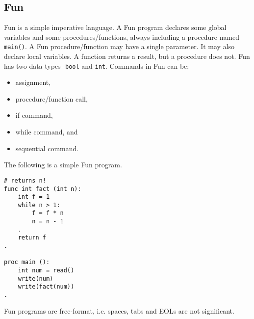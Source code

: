 \documentclass[a4paper, openany]{memoir}
\begin{document}
\subsection{Fun}
Fun is a simple imperative language. A Fun program declares some global variables and some procedures/functions, always including a procedure named \texttt{main()}. A Fun procedure/function may have a single parameter. It may also declare local variables. A function returns a result, but a procedure does not. Fun has two data types- \texttt{bool} and \texttt{int}. Commands in Fun can be:
\begin{itemize}
    \item assignment,
    \item procedure/function call,
    \item if command,
    \item while command, and
    \item sequential command.
\end{itemize}

The following is a simple Fun program.
\begin{lstlisting}[language=fun]
# returns n!
func int fact (int n): 
    int f = 1
    while n > 1:
        f = f * n
        n = n - 1
    .
    return f 
.

proc main ():
    int num = read()
    write(num)
    write(fact(num)) 
.
\end{lstlisting}
Fun programs are free-format, i.e. spaces, tabs and EOLs are not significant. 
\end{document}
